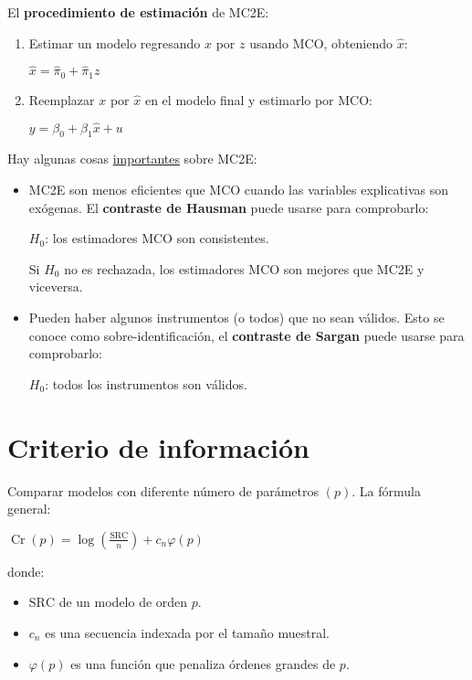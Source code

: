 \documentclass[10pt, a4paper, landscape]{article}
\DeclareMathOperator{\Cr}{Cr}
\newcommand{\SSR}{\text{SRC}}
\begin{document}
\begin{multicols}{3}
\begin{itemize}[leftmargin=*]
	El \textbf{procedimiento de estimación} de MC2E:
	\begin{enumerate}[leftmargin=*]
		\item Estimar un modelo regresando \( x \) por \( z \) usando MCO, obteniendo \( \hat{x} \):
		\begin{center}
			\( \hat{x} = \hat{\pi}_{0} + \hat{\pi}_{1} z \)
		\end{center}
		\item Reemplazar \( x \) por \( \hat{x} \) en el modelo final y estimarlo por MCO:
		\begin{center}
			\( y = \beta_{0} + \beta_{1} \hat{x}+ u \)
		\end{center}
	\end{enumerate}
	Hay algunas cosas \underline{importantes} sobre MC2E:
	\begin{itemize}[leftmargin=*]
		\item MC2E son menos eficientes que MCO cuando las variables explicativas son exógenas. El \textbf{contraste de Hausman} puede usarse para comprobarlo:
		\begin{center}
			\( H_{0} \): los estimadores MCO son consistentes.
		\end{center}
		Si \( H_{0} \) no es rechazada, los estimadores MCO son mejores que MC2E y viceversa.
		\item Pueden haber algunos instrumentos (o todos) que no sean válidos. Esto se conoce como sobre-identificación, el \textbf{contraste de Sargan} puede usarse para comprobarlo:
		\begin{center}
			\( H_{0} \): todos los instrumentos son válidos.
		\end{center}
	\end{itemize}
\end{itemize}

\columnbreak

\section*{Criterio de información}

Comparar modelos con diferente número de parámetros \( (p) \). La fórmula general:

\begin{center}
	\( \Cr(p) = \log(\frac{\SSR}{n}) + c_{n} \varphi(p) \)
\end{center}

donde:

\begin{itemize}[leftmargin=*]
	\item \( \SSR \) de un modelo de orden \( p \).
	\item \( c_{n} \) es una secuencia indexada por el tamaño muestral.
	\item \( \varphi(p) \) es una función que penaliza órdenes grandes de \( p \).
\end{itemize}


\end{multicols}
\end{document}
